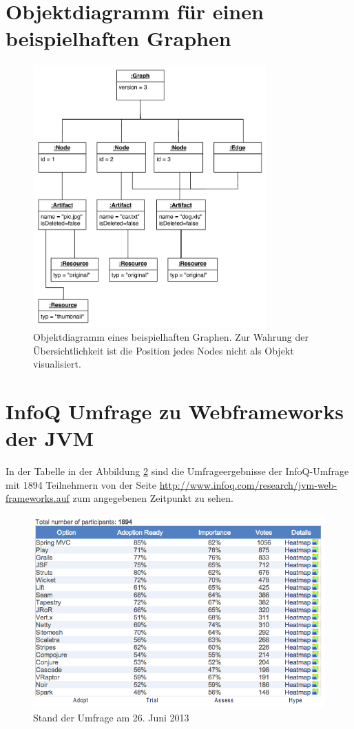 \section{Objektdiagramm für einen beispielhaften Graphen}
\begin{figure}[h!t]
  \centering     
  \includegraphics[width=0.8\textwidth]{img/instanz_graph.pdf}  
   \caption{Objektdiagramm eines beispielhaften Graphen. Zur Wahrung der Übersichtlichkeit ist die Position jedes Nodes nicht als Objekt visualisiert.}
  \label{fig:graph-bsp} 
\end{figure}
 
\section{InfoQ Umfrage zu Webframeworks der JVM}
In der Tabelle in der Abbildung \ref{fig:infoq-survey} sind die Umfrageergebnisse der InfoQ-Umfrage mit 1894 Teilnehmern von der Seite \url{http://www.infoq.com/research/jvm-web-frameworks.auf} zum angegebenen Zeitpunkt zu sehen.
\begin{figure}[ht]  
  \centering     
  \includegraphics[width=1.0\textwidth]{img/infoq.png}  
   \caption{Stand der Umfrage am 26. Juni 2013}
  \label{fig:infoq-survey} 
\end{figure}

